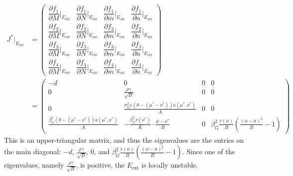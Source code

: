 \documentclass{amsart}
\theoremstyle{definition}
\theoremstyle{remark}
\numberwithin{equation}{section}
\begin{document}
\begin{align*}
	J^*|_{E_{\text{ext}}} &= \left(\begin{array}{cccc}
		\dfrac{\partial f_1}{\partial M}\Big|_{E_{\text{ext}}} & \dfrac{\partial f_1}{\partial N}\Big|_{E_{\text{ext}}} & \dfrac{\partial f_1}{\partial \overline{m}}\Big|_{E_{\text{ext}}} & \dfrac{\partial f_1}{\partial \overline{n}}\Big|_{E_{\text{ext}}} \\[10px]
		\dfrac{\partial f_2}{\partial M}\Big|_{E_{\text{ext}}} & \dfrac{\partial f_2}{\partial N}\Big|_{E_{\text{ext}}} & \dfrac{\partial f_2}{\partial \overline{m}}\Big|_{E_{\text{ext}}} & \dfrac{\partial f_2}{\partial \overline{n}}\Big|_{E_{\text{ext}}} \\[10px]
		\dfrac{\partial f_3}{\partial M}\Big|_{E_{\text{ext}}} & \dfrac{\partial f_3}{\partial N}\Big|_{E_{\text{ext}}} & \dfrac{\partial f_3}{\partial \overline{m}}\Big|_{E_{\text{ext}}} & \dfrac{\partial f_3}{\partial \overline{n}}\Big|_{E_{\text{ext}}} \\[10px]
		\dfrac{\partial f_4}{\partial M}\Big|_{E_{\text{ext}}} & \dfrac{\partial f_4}{\partial N}\Big|_{E_{\text{ext}}} & \dfrac{\partial f_4}{\partial \overline{m}}\Big|_{E_{\text{ext}}} & \dfrac{\partial f_4}{\partial \overline{n}}\Big|_{E_{\text{ext}}}
	\end{array}\right) \\
	&= \left(\begin{array}{cccc}
		-d & 0 & 0 & 0 \\[5px]
		0 & \frac{\rho\gamma}{\sqrt{B}} & 0 & 0 \\[5px]
		0 & \frac{\sigma_{G}^2e(\theta - (\mu^* - \nu^*))\overline{a}(\mu^*, \nu^*)}{A} & 0 & 0 \\[5px]
		\frac{\beta_{G}^2(\theta - (\mu^* - \nu^*))\overline{a}(\mu^*, \nu^*)}{A} & -\frac{\beta_G^2\overline{r}(\nu^*)}{K}\cdot\frac{\phi - \nu^*}{B} & 0 & \beta_G^2\frac{\overline{r}(\overline{n})}{B}\left(\frac{(\phi - \overline{n})^2}{B} - 1\right)
	\end{array}\right)
\end{align*}
This is an upper-triangular matrix, and thus the eigenvalues are the entries on the main diagonal: $-d$, $\frac{\rho\gamma}{\sqrt{B}}$, $0$, and $\beta_G^2\frac{\overline{r}(\overline{n})}{B}\left(\frac{(\phi - \overline{n})^2}{B} - 1\right)$.  Since one of the eigenvalues, namely $\frac{\rho\gamma}{\sqrt{B}}$, is positive, the $E_{\text{ext}}$ is locally unstable.
\end{document}
